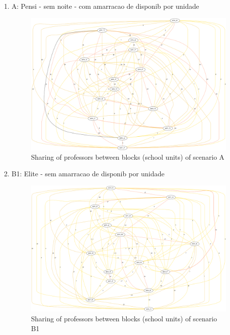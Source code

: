 \begin{enumerate}
\item A: Pensi - sem noite - com amarracao de disponib por unidade

\begin{figure}[H]
\includegraphics[scale=1.0]{"Computational Experiments/Inputs/inputPensiSemNoitePriorProfs_201501291331550_/parUnidProfsComuns-PensiSemNoitePriorProfs_201501291331550.png"}
\centering
\caption{Sharing of professors between blocks (school units) of scenario A}
\end{figure}

\item B1: Elite - sem amarracao de disponib por unidade

\begin{figure}[H]
\includegraphics[scale=1.0]{"Computational Experiments/Inputs/inputEliteComPriorProfSemDispUn_201502011233270_/parUnidProfsComuns-EliteComPriorProfSemDispUn_201502011233270.png"}
\centering
\caption{Sharing of professors between blocks (school units) of scenario B1}
\end{figure}



\end{enumerate}
